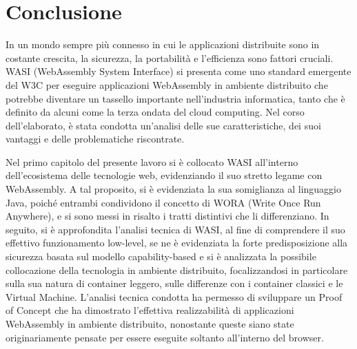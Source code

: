 \chapter*{Conclusione}

In un mondo sempre più connesso in cui le applicazioni distribuite sono in costante crescita, la sicurezza, la
portabilità e l'efficienza sono fattori cruciali. WASI (WebAssembly System Interface) si presenta come uno standard
emergente del W3C per eseguire applicazioni WebAssembly in ambiente distribuito che potrebbe diventare un tassello
importante nell'industria informatica, tanto che è definito da alcuni come la terza ondata del cloud computing. Nel
corso dell'elaborato, è stata condotta un'analisi delle sue caratteristiche, dei suoi vantaggi e delle problematiche
riscontrate.  

Nel primo capitolo del presente lavoro si è collocato WASI all'interno dell'ecosistema delle tecnologie web,
evidenziando il suo stretto legame con WebAssembly. A tal proposito, si è evidenziata la sua somiglianza al
linguaggio Java, poiché entrambi condividono il concetto di WORA (Write Once Run Anywhere), e si sono messi in risalto i
tratti distintivi che li differenziano. In seguito, si è approfondita l'analisi tecnica di WASI, al fine di comprendere
il suo effettivo funzionamento low-level, se ne è evidenziata la forte predisposizione alla sicurezza basata sul modello
capability-based e si è analizzata la possibile collocazione della tecnologia in ambiente distribuito, focalizzandosi in
particolare sulla sua natura di container leggero, sulle differenze con i container classici e le Virtual Machine.
L'analisi tecnica condotta ha permesso di sviluppare un Proof of Concept che ha dimostrato l'effettiva realizzabilità di
applicazioni WebAssembly in ambiente distribuito, nonostante queste siano state originariamente pensate per essere
eseguite soltanto all'interno del browser.

